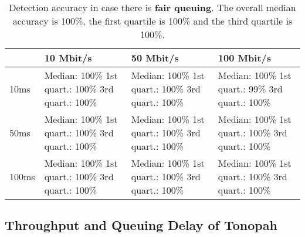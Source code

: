 \documentclass[conference]{IEEEtran}
\begin{document}
\begin{table}
\begin{tabularx}{\columnwidth}{| l | X | X | X |}
\hline
& 10 Mbit/s & 50 Mbit/s & 100 Mbit/s \\ \hline
10ms & Median: 100\% \newline 1st quart.: 100\% \newline 3rd quart.: 100\% & Median: 100\% \newline 1st quart.: 100\% \newline 3rd quart.: 100\% & Median: 100\% \newline 1st quart.: 99\% \newline 3rd quart.: 100\%\\ \hline
50ms & Median: 100\% \newline 1st quart.: 100\% \newline 3rd quart.: 100\% & Median: 100\% \newline 1st quart.: 100\% \newline 3rd quart.: 100\% & Median: 100\% \newline 1st quart.: 100\% \newline 3rd quart.: 100\% \\ \hline
100ms & Median: 100\% \newline 1st quart.: 100\% \newline 3rd quart.: 100\% & Median: 100\% \newline 1st quart.: 100\% \newline 3rd quart.: 100\% & Median: 100\% \newline 1st quart.: 100\% \newline 3rd quart.: 100\% \\ \hline
\end{tabularx}
\caption{Detection accuracy in case there is \textbf{fair queuing}.  The overall median accuracy is 100\%, the first quartile is 100\% and the third quartile is 100\%.}
\label{table:fq}
\end{table}    

\subsection{Throughput and Queuing Delay of Tonopah}
\end{document}
